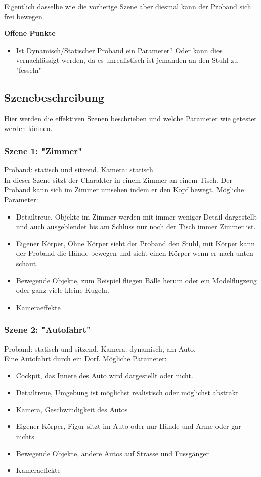 Eigentlich dasselbe wie die vorherige Szene aber diesmal kann der Proband sich frei bewegen.

\textbf{Offene Punkte}
\begin{itemize}
\item Ist Dynamisch/Statischer Proband ein Parameter? Oder kann dies vernachlässigt werden, da es unrealistisch ist jemanden an den Stuhl zu "fesseln"
\end{itemize}

\subsection{Szenebeschreibung}
Hier werden die effektiven Szenen beschrieben und welche Parameter wie getestet werden können.

\subsubsection{Szene 1: "Zimmer"}
Proband: statisch und sitzend. Kamera: statisch \\
In dieser Szene sitzt der Charakter in einem Zimmer an einem Tisch. Der Proband kann sich im Zimmer umsehen indem er den Kopf bewegt.
Mögliche Parameter: 
\begin{itemize}
\item Detailtreue, Objekte im Zimmer werden mit immer weniger Detail dargestellt und auch ausgeblendet bis am Schluss nur noch der Tisch immer Zimmer ist.
\item Eigener Körper, Ohne Körper sieht der Proband den Stuhl, mit Körper kann der Proband die Hände bewegen und sieht einen Körper wenn er nach unten schaut.
\item Bewegende Objekte, zum Beispiel fliegen Bälle herum oder ein Modelflugzeug oder ganz viele kleine Kugeln.
\item Kameraeffekte 
\end{itemize}

\subsubsection{Szene 2: "Autofahrt"}
Proband: statisch und sitzend. Kamera: dynamisch, am Auto. \\
Eine Autofahrt durch ein Dorf.
Mögliche Parameter:
\begin{itemize}
\item Cockpit, das Innere des Auto wird dargestellt oder nicht.
\item Detailtreue, Umgebung ist möglichst realistisch oder möglichst abstrakt
\item Kamera, Geschwindigkeit des Autos
\item Eigener Körper, Figur sitzt im Auto oder nur Hände und Arme oder gar nichts
\item Bewegende Objekte, andere Autos auf Strasse und Fussgänger
\item Kameraeffekte 
\end{itemize}


